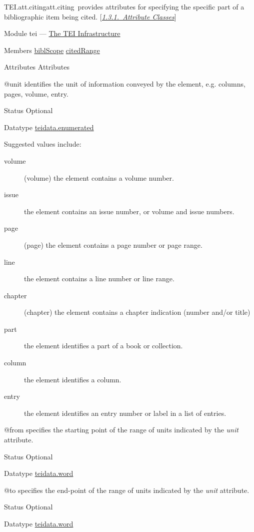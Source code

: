 \begin{reflist}
\item[]\begin{specHead}{TEI.att.citing}{att.citing} provides attributes for specifying the specific part of a bibliographic item being cited. [\textit{\hyperref[STECAT]{1.3.1.\ Attribute Classes}}]\end{specHead} 
    \item[{Module}]
  tei — \hyperref[ST]{The TEI Infrastructure}
    \item[{Members}]
  \hyperref[TEI.biblScope]{biblScope} \hyperref[TEI.citedRange]{citedRange}
    \item[{Attributes}]
  Attributes\hfil\\[-10pt]\begin{sansreflist}
    \item[@unit]
  identifies the unit of information conveyed by the element, e.g. columns, pages, volume, entry.
\begin{reflist}
    \item[{Status}]
  Optional
    \item[{Datatype}]
  \hyperref[TEI.teidata.enumerated]{teidata.enumerated}
    \item[{Suggested values include:}]
  \begin{description}

\item[{volume}](volume) the element contains a volume number.
\item[{issue}]the element contains an issue number, or volume and issue numbers.
\item[{page}](page) the element contains a page number or page range.
\item[{line}]the element contains a line number or line range.
\item[{chapter}](chapter) the element contains a chapter indication (number and/or title)
\item[{part}]the element identifies a part of a book or collection.
\item[{column}]the element identifies a column.
\item[{entry}]the element identifies an entry number or label in a list of entries.
\end{description} 
\end{reflist}  
    \item[@from]
  specifies the starting point of the range of units indicated by the {\itshape unit} attribute.
\begin{reflist}
    \item[{Status}]
  Optional
    \item[{Datatype}]
  \hyperref[TEI.teidata.word]{teidata.word}
\end{reflist}  
    \item[@to]
  specifies the end-point of the range of units indicated by the {\itshape unit} attribute.
\begin{reflist}
    \item[{Status}]
  Optional
    \item[{Datatype}]
  \hyperref[TEI.teidata.word]{teidata.word}
\end{reflist}  
\end{sansreflist}  
\end{reflist}  
